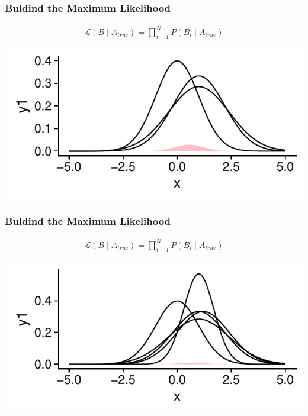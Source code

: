 \documentclass[handout]{beamer}\usepackage[]{graphicx}\usepackage[]{color}
\makeatletter
\def\maxwidth{ %
  \ifdim\Gin@nat@width>\linewidth
    \linewidth
  \else
    \Gin@nat@width
  \fi
}
\newenvironment{knitrout}{}{} %
\makeatother
\begin{document}
\begin{frame}
\frametitle{Buldind the Maximum Likelihood}
\begin{align*}
\mathcal{L}(B \mid A_{true}) =  \prod_{i=1}^{N} P(B_{i} \mid A_{true})
\end{align*}


\begin{knitrout}
\color{fgcolor}
\includegraphics[width=\maxwidth]{figure/unnamed-chunk-3-1} 

\end{knitrout}


\end{frame}

\begin{frame}
\frametitle{Buldind the Maximum Likelihood}
\begin{align*}
\mathcal{L}(B \mid A_{true}) =  \prod_{i=1}^{N} P(B_{i} \mid A_{true})
\end{align*}

\begin{knitrout}
\color{fgcolor}
\includegraphics[width=\maxwidth]{figure/unnamed-chunk-4-1} 

\end{knitrout}


\end{frame}
\end{document}
